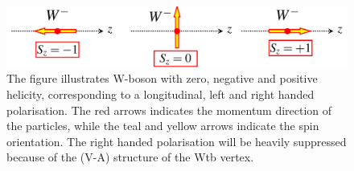 \documentclass[12pt,a4paper]{article}
\numberwithin{equation}{section}
\begin{document}
\begin{figure}[H]
  \includegraphics[width=\linewidth]{figures/w_polarization.png}
  \begin{tikzpicture}
  \end{tikzpicture}
  \caption{The figure illustrates W-boson with zero, negative and positive
    helicity, corresponding to a longitudinal, left and right handed
    polarisation. The red arrows indicates the momentum direction of the
    particles, while the teal and yellow arrows indicate the spin orientation.
    The right handed polarisation will be heavily suppressed because of the
    (V-A) structure of the Wtb vertex.}\label{fig:polarisation}
\end{figure}
\end{document}
